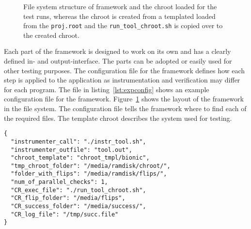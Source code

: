 \begin{figure}
\centering
{}
\caption{File system structure of framework and the chroot loaded for the test
runs, whereas the chroot is created from a templated loaded from the
\texttt{proj.root} and the \texttt{run\_tool\_chroot.sh} is copied over to the
created chroot.}
\label{fig:framfilesys}
\end{figure}

Each part of the framework is designed to work on its own and has a clearly
defined in- and output-interface. The parts can be adopted or easily used for
other testing purposes. The configuration file for the framework defines how
each step is applied to the application as instrumentation and verification may
differ for each program. The file in listing~\ref{lst:expconfig} shows an
example configuration file for the framework. Figure~\ref{fig:framfilesys} shows
the layout of the framework in the file system. The configuration file tells the
framework where to find each of the required files. The template chroot
describes the system used for testing.

\begin{minipage}{\linewidth}
\begin{lstlisting}[style=nasm,
                   caption={JSON style config file for the framework, showing
all parameters used to tweak each part of the framework. Entries
starting with \texttt{CR\_} are used inside the testing \texttt{chroot}.},
                   label={lst:expconfig}]
{
  "instrumenter_call": "./instr_tool.sh",
  "instrumenter_outfile": "tool.out",
  "chroot_template": "chroot_tmpl/bionic",
  "tmp_chroot_folder": "/media/ramdisk/chroot/",
  "folder_with_flips": "/media/ramdisk/flips/",
  "num_of_parallel_checks": 1,
  "CR_exec_file": "./run_tool_chroot.sh",
  "CR_flip_folder": "/media/flips",
  "CR_success_folder": "/media/success/",
  "CR_log_file": "/tmp/succ.file"
}
\end{lstlisting}
\end{minipage}

